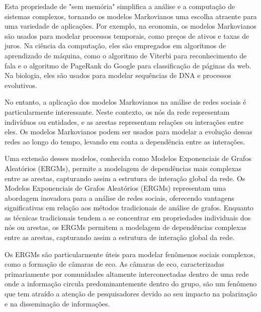 Esta propriedade de "sem memória" simplifica a análise e a computação de sistemas complexos, tornando os modelos Markovianos uma escolha atraente para uma variedade de aplicações. Por exemplo, na economia, os modelos Markovianos são usados para modelar processos temporais, como preços de ativos e taxas de juros. Na ciência da computação, eles são empregados em algoritmos de aprendizado de máquina, como o algoritmo de Viterbi para reconhecimento de fala e o algoritmo de PageRank do Google para classificação de páginas da web. Na biologia, eles são usados para modelar sequências de DNA e processos evolutivos.

No entanto, a aplicação dos modelos Markovianos na análise de redes sociais é particularmente interessante. Neste contexto, os nós da rede representam indivíduos ou entidades, e as arestas representam relações ou interações entre eles. Os modelos Markovianos podem ser usados para modelar a evolução dessas redes ao longo do tempo, levando em conta a dependência entre as interações.

Uma extensão desses modelos, conhecida como Modelos Exponenciais de Grafos Aleatórios (ERGMs), permite a modelagem de dependências mais complexas entre as arestas, capturando assim a estrutura de interação global da rede. Os Modelos Exponenciais de Grafos Aleatórios (ERGMs) representam uma abordagem inovadora para a análise de redes sociais, oferecendo vantagens significativas em relação aos métodos tradicionais de análise de grafos. Enquanto as técnicas tradicionais tendem a se concentrar em propriedades individuais dos nós ou arestas, os ERGMs permitem a modelagem de dependências complexas entre as arestas, capturando assim a estrutura de interação global da rede.

Os ERGMs são particularmente úteis para modelar fenômenos sociais complexos, como a formação de câmaras de eco. As câmaras de eco, caracterizadas primariamente por comunidades altamente interconectadas dentro de uma rede onde a informação circula predominantemente dentro do grupo, são um fenômeno que tem atraído a atenção de pesquisadores devido ao seu impacto na polarização e na disseminação de informações.

